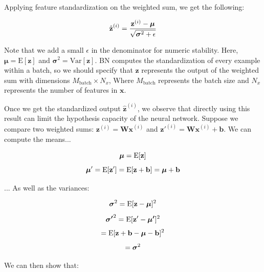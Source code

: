 \documentclass{article}
\begin{document}
\begin{multicols*}{2}
Applying feature standardization on the weighted sum, we get the following:

\begin{equation}
    \hat{\textbf{z}}^{(i)} = {\textbf{z}^{(i)} - \boldsymbol{\mu}\over \sqrt{\boldsymbol{\sigma}^2 + \epsilon}} 
\end{equation}

Note that we add a small $\epsilon$ in the denominator for numeric stability.
Here, $\boldsymbol{\mu} = \text{E}[\textbf{z}]$ and 
$\boldsymbol{\sigma}^2 = \text{Var}[\textbf{z}]$. BN computes the standardization
of every example within a batch, so we should specify that $\textbf{z}$
represents the output of the weighted sum with dimensions $M_{\text{batch}} \times N_x$,
Where $M_{\text{batch}}$ represents the batch size and $N_x$ represents the 
number of features in $\textbf{x}$.

Once we get the standardized output 
$\hat{\textbf{z}}^{(i)}$, we observe that directly using this result can limit 
the hypothesis capacity of the neural network. Suppose we compare two
weighted sums: $\textbf{z}^{(i)} = \textbf{Wx}^{(i)}$ and $\textbf{z}'^{(i)} = \textbf{Wx}^{(i)} + \textbf{b}$.
We can compute the means...

\begin{equation}
    \boldsymbol{\mu} = \text{E}[\textbf{z}] \notag
\end{equation}
\begin{equation}
    \boldsymbol{\mu}' = \text{E}[\textbf{z}'] = \text{E}[\textbf{z} + \textbf{b}] = \boldsymbol{\mu} + \textbf{b} \notag
\end{equation}

... As well as the variances:

\begin{equation}
    \boldsymbol{\sigma}^2 = \text{E}[\textbf{z} - \boldsymbol{\mu}]^2\notag
\end{equation}
\begin{equation}
    \boldsymbol{\sigma'}^2 = \text{E}[\textbf{z}' - \boldsymbol{\mu'}]^2\notag
\end{equation}
\begin{equation}
     = \text{E}[\textbf{z} + \textbf{b} - \boldsymbol{\mu} - \textbf{b}]^2\notag
\end{equation}
\begin{equation}
    = \boldsymbol{\sigma}^2 \notag
\end{equation}


We can then show that:


\end{multicols*}
\end{document}
